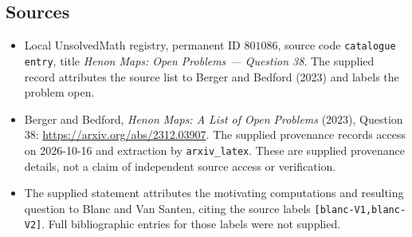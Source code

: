 \documentclass[11pt]{article}
\begin{document}
\subsection{Sources}
\begin{itemize}
\item Local UnsolvedMath registry, permanent ID \(801086\), source code \texttt{catalogue entry}, title \emph{Henon Maps: Open Problems --- Question 38}. The supplied record attributes the source list to Berger and Bedford (2023) and labels the problem open.
\item Berger and Bedford, \emph{Henon Maps: A List of Open Problems} (2023), Question 38: \url{https://arxiv.org/abs/2312.03907}. The supplied provenance records access on 2026-10-16 and extraction by \texttt{arxiv\_latex}. These are supplied provenance details, not a claim of independent source access or verification.
\item The supplied statement attributes the motivating computations and resulting question to Blanc and Van Santen, citing the source labels \texttt{[blanc-V1,blanc-V2]}. Full bibliographic entries for those labels were not supplied.
\end{itemize}
\end{document}
